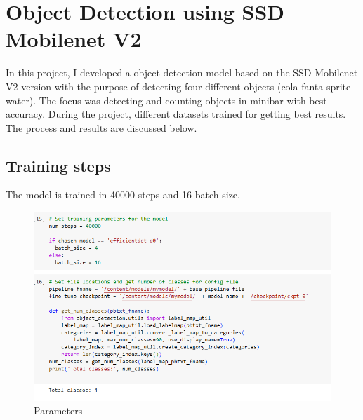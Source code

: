 \chapter{Object Detection using SSD Mobilenet V2}

In this project, I developed a object detection model based on the SSD Mobilenet V2 version with the purpose of detecting four different objects (cola fanta sprite water). The focus was detecting and counting objects in minibar with best accuracy. During the project, different datasets trained for getting best results. The process and results are discussed below. 

\section{Training steps}

The model is trained in 40000 steps and 16 batch size.
\begin{figure}[!htbp]
    \centering
    \includegraphics[width=1\textwidth]{Imgs/parameters.PNG}
    \caption{\label{fig:parameters}Parameters }
\end{figure}

